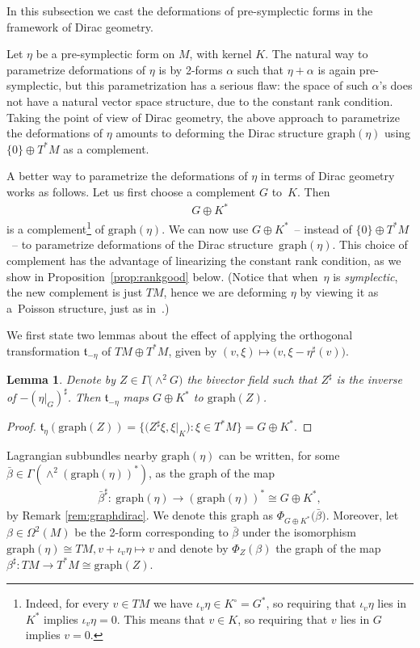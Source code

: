 \documentclass[pdftex]{sigma}
\numberwithin{equation}{section}
\newtheorem{Lemma}[Theorem]{Lemma}
\renewcommand{\t}{\mathfrak{t}}
\begin{document}
In this subsection we cast the deformations of pre-symplectic forms in the framework of Dirac geometry.

Let $\eta$ be a pre-symplectic form on $M$, with kernel $K$. The natural way to parametrize deformations of $\eta$ is by 2-forms $\alpha$ such that $\eta+\alpha$ is again pre-symplectic, but this parametrization has a serious flaw: the space of such $\alpha$'s does not have a natural vector space structure, due to the constant rank condition. Taking the point of view of Dirac geometry, the above approach to parametrize the deformations of $\eta$ amounts to deforming the Dirac structure $\mathrm{graph}(\eta)$ using $\{0\}\oplus T^*M$ as a complement.

A better way to parametrize the deformations of $\eta$ in terms of Dirac geometry works as follows. Let us first choose a complement $G$ to~$K$. Then
\begin{gather*}G\oplus K^*\end{gather*} is a complement\footnote{Indeed, for every $v\in TM$ we have $\iota_v \eta \in K^{\circ}=G^*$, so requiring that $\iota_v \eta $ lies in $K^*$ implies $\iota_v \eta=0$. This means that $v\in K$, so requiring that $v$ lies in $G$ implies $v=0$.} of $\mathrm{graph}(\eta)$. We can now use $G\oplus K^*$~-- instead of $\{0\}\oplus T^*M$~-- to parametrize deformations of the Dirac structure~$\mathrm{graph}(\eta)$. This choice of complement has the advantage of linearizing the constant rank condition, as we show in Proposition~\ref{prop:rankgood} below. (Notice that when~$\eta$ is {\em symplectic}, the new complement is just $TM$, hence we are deforming $\eta$ by viewing it as a~Poisson structure, just as in~\cite[Section~1.3]{SZPre}.)

We first state two lemmas about the effect of applying the orthogonal transformation $\t_{-\eta}$ of $TM\oplus T^*M$, given by $(v,\xi) \mapsto \big(v,\xi - \eta^\sharp(v)\big)$.

\begin{Lemma}\label{lemma:teZ}Denote by $Z\in \Gamma\big({\wedge}^2 G\big)$ the bivector field such that $Z^{\sharp}$ is the inverse of $-(\eta|_G)^{\sharp}$. Then $\t_{-\eta}$ maps $G\oplus K^*$ to $\mathrm{graph}(Z)$.
\end{Lemma}
\begin{proof}$\t_\eta(\mathrm{graph}(Z))= \big\{\big( Z^\sharp\xi , \xi|_K \big)\colon \xi\in T^*M\big\}=G\oplus K^*$.\end{proof}

Lagrangian subbundles nearby $\mathrm{graph}(\eta)$ can be written, for some $\bar{\beta}\in \Gamma(\wedge^2(\mathrm{graph}(\eta))^*)$, as the graph of the map
\begin{gather*}\bar{\beta}^{\sharp}\colon \ \mathrm{graph}(\eta) \to (\mathrm{graph}(\eta))^*\cong G\oplus K^*,\end{gather*}
by Remark \ref{rem:graphdirac}. We denote this graph as $\Phi_{G\oplus K^*}\big(\bar{\beta}\big)$. Moreover, let $\beta\in \Omega^2(M)$ be the 2-form corresponding to $\bar{\beta}$ under the isomorphism $\mathrm{graph}(\eta)\cong TM, v+\iota_v\eta \mapsto v$ and denote by $\Phi_{Z}({\beta})$ the graph of the map $ \beta^{\sharp}\colon TM\to T^*M\cong \mathrm{graph}(Z)$.
\end{document}
